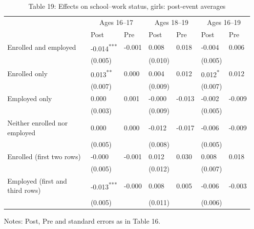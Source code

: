 \documentclass[12pt]{article}
\begin{document}
\begin{table}
\centering
\caption{Table 19: Effects on school--work status, girls: post-event averages}

\small
\begin{tabular}{p{}p{}p{}p{}p{}p{}p{}}
\toprule
 & \multicolumn{2}{c}{Ages 16--17} & \multicolumn{2}{c}{Ages 18--19} & \multicolumn{2}{c}{Ages 16--19} \\

 & Post & Pre & Post & Pre & Post & Pre \\
\midrule
Enrolled and employed & -0.014\textsuperscript{***} & -0.001 & 0.008 & 0.018 & -0.004 & 0.006 \\
 & (0.005) &  & (0.010) &  & (0.005) &  \\
Enrolled only & 0.013\textsuperscript{**} & 0.000 & 0.004 & 0.012 & 0.012\textsuperscript{*} & 0.012 \\
 & (0.007) &  & (0.009) &  & (0.007) &  \\
Employed only & 0.000 & 0.001 & -0.000 & -0.013 & -0.002 & -0.009 \\
 & (0.003) &  & (0.009) &  & (0.005) &  \\
Neither enrolled nor employed & 0.000 & 0.000 & -0.012 & -0.017 & -0.006 & -0.009 \\
 & (0.005) &  & (0.008) &  & (0.005) &  \\
Enrolled (first two rows) & -0.000 & -0.001 & 0.012 & 0.030 & 0.008 & 0.018 \\
 & (0.005) &  & (0.012) &  & (0.007) &  \\
Employed (first and third rows) & -0.013\textsuperscript{***} & -0.000 & 0.008 & 0.005 & -0.006 & -0.003 \\
 & (0.005) &  & (0.011) &  & (0.006) &  \\
\bottomrule
\end{tabular}



\noindent\small Notes: Post, Pre and standard errors as in Table 16.

\end{table}
\end{document}

